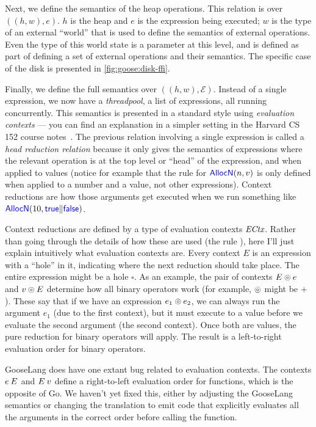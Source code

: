 Next, we define the semantics of the heap operations. This relation is over
$((h, w), e)$. $h$ is the heap and $e$ is the expression being executed; $w$ is
the type of an external ``world'' that is used to define the semantics of
external operations. Even the type of this world state is a parameter at this
level, and is defined as part of defining a set of external operations and their
semantics. The specific case of the disk is presented in
\cref{fig:goose:disk-ffi}.

Finally, we define the full semantics over $((h, w), \mathcal{E})$. Instead of a
single expression, we now have a \emph{threadpool}, a list of expressions, all
running concurrently. This semantics is presented in a standard style using
\emph{evaluation contexts} --- you can find an explanation in a simpler setting
in the Harvard CS 152 course notes~\cite[Lec 10]{chong:cs152-notes}. The
previous relation involving a single expression is called a \emph{head reduction
  relation} because it only gives the semantics of expressions where the
relevant operation is at the top level or ``head'' of the expression, and when
applied to values (notice for example that the rule for $\mathsf{\textcolor{blue}{AllocN}}(n, v)$
is only defined when applied to a number and a value, not other expressions).
Context reductions are how those arguments get executed when we run something
like $\mathsf{\textcolor{blue}{AllocN}}(10, \mathsf{\textcolor{blue}{true}} \| \mathsf{\textcolor{blue}{false}})$.

Context reductions are defined by a type of evaluation contexts
$\textit{ECtx}$. Rather than going through the details of how these are used
(the rule ), here I'll just explain intuitively what
evaluation contexts are. Every context $E$ is an expression with a ``hole'' in
it, indicating where the next reduction should take place. The entire expression
might be a hole $\square$. As an example, the pair of contexts $E \circledcirc e$ and
$v \circledcirc E$ determine how all binary operators work (for example, $\circledcirc$
might be $+$). These say that if we have an expression $e_{1} \circledcirc e_{2}$, we can
always run the argument $e_{1}$ (due to the first context), but it must execute
to a value before we evaluate the second argument (the second context). Once
both are values, the pure reduction for binary operators will apply. The result
is a left-to-right evaluation order for binary operators.

GooseLang does have one extant bug related to evaluation contexts. The contexts
$e \: E$ and $E \: v$ define a right-to-left evaluation order for functions,
which is the opposite of Go. We haven't yet fixed this, either by adjusting the
GooseLang semantics or changing the translation to emit code that explicitly
evaluates all the arguments in the correct order before calling the function.

